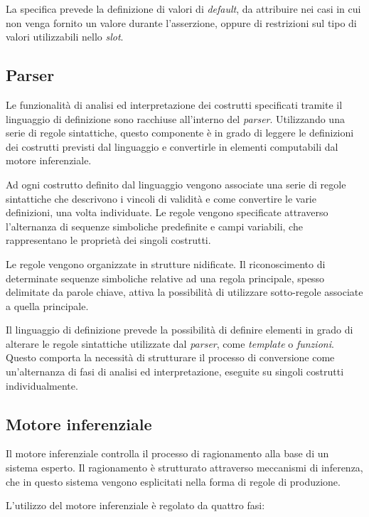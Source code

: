 La specifica prevede la definizione di valori di \emph{default}, da attribuire nei casi in cui non venga fornito un valore durante l'asserzione, oppure di restrizioni sul tipo di valori utilizzabili nello \emph{slot}.

\subsection{Parser}\label{par:parser}

Le funzionalità di analisi ed interpretazione dei costrutti specificati tramite il linguaggio di definizione sono racchiuse all'interno del \emph{parser}. Utilizzando una serie di regole sintattiche, questo componente è in grado di leggere le definizioni dei costrutti previsti dal linguaggio e convertirle in elementi computabili dal motore inferenziale.

Ad ogni costrutto definito dal linguaggio vengono associate una serie di regole sintattiche che descrivono i vincoli di validità e come convertire le varie definizioni, una volta individuate. Le regole vengono specificate attraverso l'alternanza di sequenze simboliche predefinite e campi variabili, che rappresentano le proprietà dei singoli costrutti.

Le regole vengono organizzate in strutture nidificate. Il riconoscimento di determinate sequenze simboliche relative ad una regola principale, spesso delimitate da parole chiave, attiva la possibilità di utilizzare sotto-regole associate a quella principale.

Il linguaggio di definizione prevede la possibilità di definire elementi in grado di alterare le regole sintattiche utilizzate dal \emph{parser}, come \emph{template} o \emph{funzioni}. Questo comporta la necessità di strutturare il processo di conversione come un'alternanza di fasi di analisi ed interpretazione, eseguite su singoli costrutti individualmente.

\subsection{Motore inferenziale}\label{par:motore-inferenziale}

Il motore inferenziale controlla il processo di ragionamento alla base di un sistema esperto. Il ragionamento è strutturato attraverso meccanismi di inferenza, che in questo sistema vengono esplicitati nella forma di regole di produzione.

L'utilizzo del motore inferenziale è regolato da quattro fasi:


